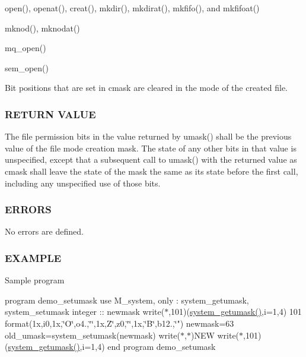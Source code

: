 \begin{DoxyItemize}
\item open(), openat(), creat(), mkdir(), mkdirat(), mkfifo(), and mkfifoat()
\item mknod(), mknodat()
\item mq\+\_\+open()
\item sem\+\_\+open()
\end{DoxyItemize}

Bit positions that are set in cmask are cleared in the mode of the created file.

\subsubsection*{R\+E\+T\+U\+RN V\+A\+L\+UE}

The file permission bits in the value returned by umask() shall be the previous value of the file mode creation mask. The state of any other bits in that value is unspecified, except that a subsequent call to umask() with the returned value as cmask shall leave the state of the mask the same as its state before the first call, including any unspecified use of those bits.

\subsubsection*{E\+R\+R\+O\+RS}

No errors are defined.

\subsubsection*{E\+X\+A\+M\+P\+LE}

Sample program

program demo\+\_\+setumask use M\+\_\+system, only \+: system\+\_\+getumask, system\+\_\+setumask integer \+:\+: newmask write($\ast$,101)(\hyperlink{namespacem__system_aa9ca951be39d2ea738d627cf42c00ddd}{system\+\_\+getumask()},i=1,4) 101 format(1x,i0,1x,\char`\"{}\+O\textquotesingle{}\char`\"{},o4.,\char`\"{}\textquotesingle{}\char`\"{},1x,\textquotesingle{}Z\char`\"{}\textquotesingle{},z0,\char`\"{}\textquotesingle{}\char`\"{},1x,\char`\"{}B\textquotesingle{}\char`\"{},b12.,\char`\"{}\textquotesingle{}") newmask=63 old\+\_\+umask=system\+\_\+setumask(newmask) write($\ast$,$\ast$)\textquotesingle{}N\+EW\textquotesingle{} write($\ast$,101)(\hyperlink{namespacem__system_aa9ca951be39d2ea738d627cf42c00ddd}{system\+\_\+getumask()},i=1,4) end program demo\+\_\+setumask

